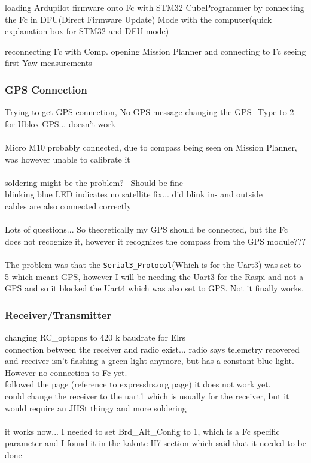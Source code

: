 \documentclass{article}
\begin{document}
	loading Ardupilot firmware onto Fc with STM32 CubeProgrammer by connecting the Fc in DFU(Direct Firmware Update) Mode with the computer(quick explanation box for STM32 and DFU mode)
	
	reconnecting Fc with Comp. 
	opening Mission Planner and connecting to Fc seeing first Yaw measurements 
	\subsubsection{GPS Connection}
	
	Trying to get GPS connection, No GPS message
	changing the GPS\_Type to 2 for Ublox GPS... doesn't work
	\\
	\\ Micro M10 probably connected, due to compass being seen on Mission Planner, was however unable to calibrate it
	\\
	\\ soldering might be the problem?-- Should be fine
	\\ blinking blue LED indicates no satellite fix... did blink in- and outside
	\\ cables are also connected correctly
	\\
	\\ Lots of questions... So theoretically my GPS should be connected, but the Fc does not recognize it, however it recognizes the compass from the GPS module???
	\\
	\\ The problem was that the \lstinline|Serial3_Protocol|(Which is for the Uart3) was set to 5 which meant GPS, however I will be needing the Uart3 for the Raspi and not a GPS and so it blocked the Uart4 which was also set to GPS. Not it finally works.
	\subsubsection{Receiver/Transmitter}
	changing RC\_optopns to 420 k baudrate for Elrs
	\\ connection between the receiver and radio exist... radio says telemetry recovered and receiver isn't flashing a green light anymore, but has a constant blue light. However no connection to Fc yet.
	\\ followed the page (reference to expresslrs.org page) it does not work yet. 
	\\ could change the receiver to the uart1 which is usually for the receiver, but it would require an JHSt thingy and more soldering
	\\
	\\ it works now... I needed to set Brd\_Alt\_Config to 1, which is a Fc specific parameter and I found it in the kakute H7 section which said that it needed to be done
\end{document}
